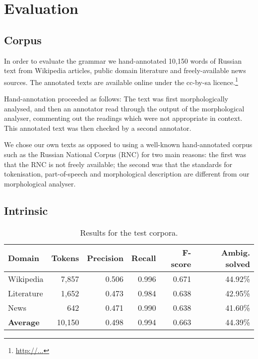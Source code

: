 \documentclass[11pt]{article}
\begin{document}
\section{Evaluation}

\subsection{Corpus}

In order to evaluate the grammar we hand-annotated 10,150 words of Russian text
from Wikipedia articles, public domain literature and freely-available news sources. The
annotated texts are available online under the {\sc cc-by-sa} licence.\footnote{\url{http://...}}

Hand-annotation proceeded as follows: The text was first morphologically analysed, 
and then an annotator read through the output of the morphological analyser, commenting
out the readings which were not appropriate in context. This annotated text was then checked
by a second annotator.

We chose our own texts as opposed to using a well-known hand-annotated corpus
such as the Russian National Corpus (RNC) for two main reasons: the first was that the 
RNC is not freely available; the second was that the standards for tokenisation, part-of-speech
and morphological description are different from our morphological analyser.

\subsection{Intrinsic}

\begin{table*}
  \centering
  \begin{tabular}{|l|r|r|r|r|r|}
    \hline
    \textbf{Domain} & \textbf{Tokens} & \textbf{Precision} & \textbf{Recall} & \textbf{F-score} & \textbf{Ambig. solved} \\
    \hline
    Wikipedia       & 7,857      & 0.506        & 0.996    & 0.671 & 44.92\%  \\
    Literature      & 1,652      & 0.473        & 0.984    & 0.638 & 42.95\%  \\
    News            & 642        & 0.471        & 0.990    & 0.638 & 41.60\%  \\
    \hline
    \textbf{Average}& 10,150     & 0.498        &  0.994   & 0.663 & 44.39\% \\
    \hline
  \end{tabular}
  \caption{Results for the test corpora.}
\end{table*}
\end{document}
